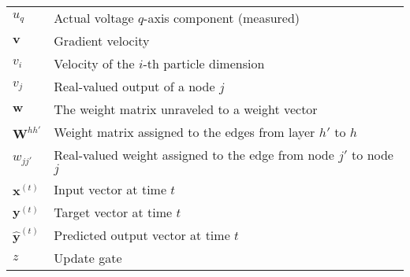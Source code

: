 \begin{flushleft}
\begin{longtable}{L{4.2cm}L{11.3cm}}
   $u_q$ & Actual voltage $q$-axis component (measured)\\
   $\bm v$ & Gradient velocity\\
   $v_i$ & Velocity of the $i$-th particle dimension\\
   $v_j$ & Real-valued output of a node $j$\\      
   $\bm w$ & The weight matrix unraveled to a weight vector\\
   $\bm W^{hh'}$ & Weight matrix assigned to the edges from layer $h'$ to $h$\\
   $w_{jj'}$ & Real-valued weight assigned to the edge from node $j'$ to node $j$\\
   $\bm x^{(t)}$ & Input vector at time $t$\\
   $\bm y^{(t)}$ & Target vector at time $t$\\
   $\bm{\hat y}^(t)$ & Predicted output vector at time $t$\\
   $z$ & Update gate\\
  \end{longtable}
\end{flushleft}
